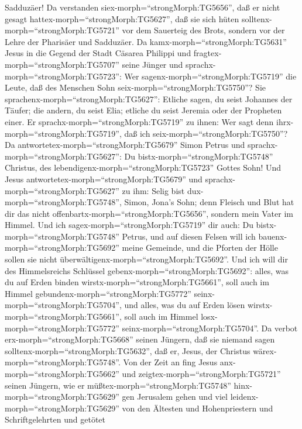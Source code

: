 Sadduzäer!  Da verstanden
siex-morph=``strongMorph:TG5656'', daß er nicht gesagt
hattex-morph=``strongMorph:TG5627'', daß sie sich hüten
solltenx-morph=``strongMorph:TG5721'' vor dem Sauerteig des Brots,
sondern vor der Lehre der Pharisäer und Sadduzäer.  Da
kamx-morph=``strongMorph:TG5631'' Jesus in die Gegend der Stadt Cäsarea
Philippi und fragtex-morph=``strongMorph:TG5707'' seine Jünger und
sprachx-morph=``strongMorph:TG5723'': Wer
sagenx-morph=``strongMorph:TG5719'' die Leute, daß des Menschen Sohn
seix-morph=``strongMorph:TG5750''?  Sie
sprachenx-morph=``strongMorph:TG5627'': Etliche sagen, du seist Johannes
der Täufer; die andern, du seist Elia; etliche du seist Jeremia oder der
Propheten einer.  Er sprachx-morph=``strongMorph:TG5719''
zu ihnen: Wer sagt denn ihrx-morph=``strongMorph:TG5719'', daß ich
seix-morph=``strongMorph:TG5750''?  Da
antwortetex-morph=``strongMorph:TG5679'' Simon Petrus und
sprachx-morph=``strongMorph:TG5627'': Du
bistx-morph=``strongMorph:TG5748'' Christus, des
lebendigenx-morph=``strongMorph:TG5723'' Gottes Sohn!  Und
Jesus antwortetex-morph=``strongMorph:TG5679'' und
sprachx-morph=``strongMorph:TG5627'' zu ihm: Selig bist
dux-morph=``strongMorph:TG5748'', Simon, Jona's Sohn; denn Fleisch und
Blut hat dir das nicht offenbartx-morph=``strongMorph:TG5656'', sondern
mein Vater im Himmel.  Und ich
sagex-morph=``strongMorph:TG5719'' dir auch: Du
bistx-morph=``strongMorph:TG5748'' Petrus, und auf diesen Felsen will
ich bauenx-morph=``strongMorph:TG5692'' meine Gemeinde, und die Pforten
der Hölle sollen sie nicht überwältigenx-morph=``strongMorph:TG5692''.
 Und ich will dir des Himmelsreichs Schlüssel
gebenx-morph=``strongMorph:TG5692'': alles, was du auf Erden binden
wirstx-morph=``strongMorph:TG5661'', soll auch im Himmel
gebundenx-morph=``strongMorph:TG5772''
seinx-morph=``strongMorph:TG5704'', und alles, was du auf Erden lösen
wirstx-morph=``strongMorph:TG5661'', soll auch im Himmel
losx-morph=``strongMorph:TG5772'' seinx-morph=``strongMorph:TG5704''.
 Da verbot erx-morph=``strongMorph:TG5668'' seinen Jüngern,
daß sie niemand sagen solltenx-morph=``strongMorph:TG5632'', daß er,
Jesus, der Christus wärex-morph=``strongMorph:TG5748''. 
Von der Zeit an fing Jesus anx-morph=``strongMorph:TG5662'' und
zeigtex-morph=``strongMorph:TG5721'' seinen Jüngern, wie er
müßtex-morph=``strongMorph:TG5748'' hinx-morph=``strongMorph:TG5629''
gen Jerusalem gehen und viel leidenx-morph=``strongMorph:TG5629'' von
den Ältesten und Hohenpriestern und Schriftgelehrten und getötet
